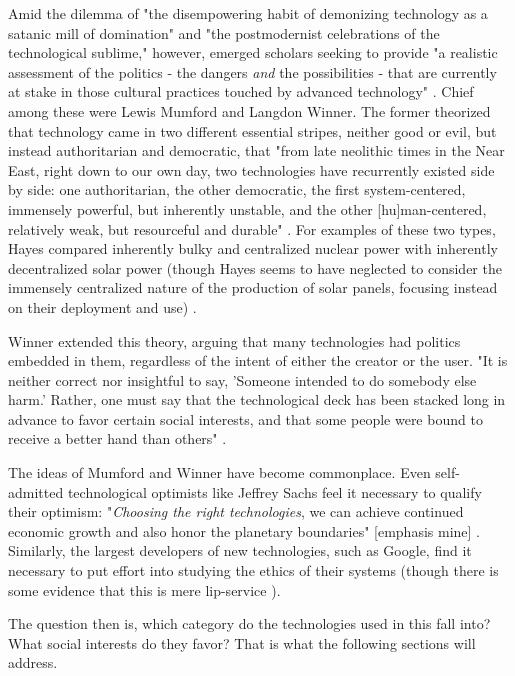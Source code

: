 Amid the dilemma of "the disempowering habit of demonizing technology as a satanic mill of domination" and "the postmodernist celebrations of the technological sublime," however, emerged scholars seeking to provide "a realistic assessment of the politics - the dangers \textit{and} the possibilities - that are currently at stake in those cultural practices touched by advanced technology"  \cite{penleyTechnoculture1991}. Chief among these were Lewis Mumford and Langdon Winner. The former theorized that technology came in two different essential stripes, neither good or evil, but instead authoritarian and democratic, that "from late neolithic times in the Near East, right down to our own day, two technologies have recurrently existed side by side: one authoritarian, the other democratic, the first system-centered, immensely powerful, but inherently unstable, and the other [hu]man-centered, relatively weak, but resourceful and durable" \cite{mumfordAuthoritarianDemocraticTechnics1964}. For examples of these two types, Hayes compared inherently bulky and centralized nuclear power with inherently decentralized solar power (though Hayes seems to have neglected to consider the immensely centralized nature of the production of solar panels, focusing instead on their deployment and use) \cite{hayesRaysHopeTransition1977}. 

Winner extended this theory, arguing that many technologies had politics embedded in them, regardless of the intent of either the creator or the user. "It is neither correct nor insightful to say, 'Someone intended to do somebody else harm.' Rather, one must say that the technological deck has been stacked long in advance to favor certain social interests, and that some people were bound to receive a better hand than others" \cite{winnerArtifactsHavePolitics1980}.

The ideas of Mumford and Winner have become commonplace. Even self-admitted technological optimists like Jeffrey Sachs \cite{sachsOptimismNewYear2021} feel it necessary to qualify their optimism: "\textit{Choosing the right technologies}, we can achieve continued economic growth and also honor the planetary boundaries" [emphasis mine] \cite{sachsAgeSustainableDevelopment2015}. Similarly, the largest developers of new technologies, such as Google, find it necessary to put effort into studying the ethics of their systems (though there is some evidence that this is mere lip-service \cite{simoniteWhatReallyHappened}). 

The question then is, which category do the technologies used in this fall into? What social interests do they favor? That is what the following sections will address.

